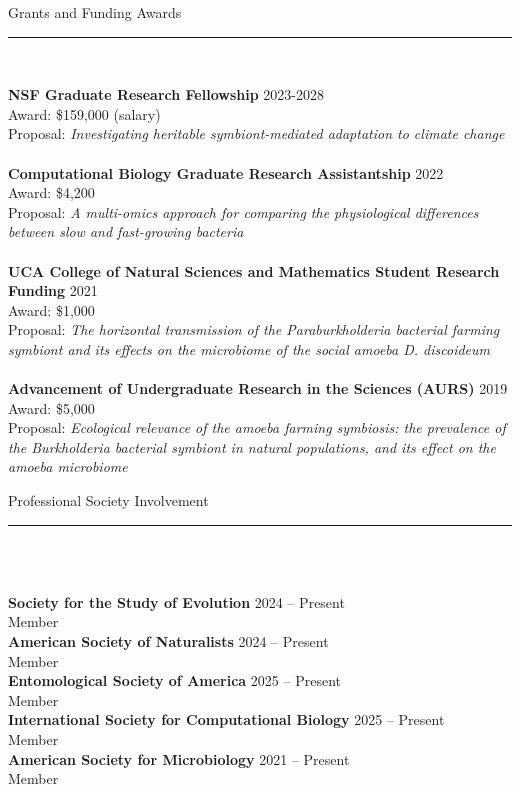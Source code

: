 \documentclass{article}
\begin{document}
\begin{flushleft}
{\Large Grants and Funding Awards} \rule{16.51cm}{0.4pt}\\
\end{flushleft}
\textbf{NSF Graduate Research Fellowship} \hfill 2023-2028\\
Award: \$159,000 (salary)\\
Proposal: \emph{Investigating heritable symbiont-mediated adaptation to climate change}\\
\\
\textbf{Computational Biology Graduate Research Assistantship} \hfill 2022\\
Award: \$4,200\\
Proposal: \emph{A multi-omics approach for comparing the physiological differences between slow and fast-growing bacteria}\\
\\
\textbf{UCA College of Natural Sciences and Mathematics Student Research Funding} \hfill 2021\\
Award: \$1,000\\
Proposal: \emph{The horizontal transmission of the Paraburkholderia bacterial farming symbiont and its effects on the microbiome of the social amoeba D. discoideum}\\
\\
\textbf{Advancement of Undergraduate Research in the Sciences (AURS)} \hfill 2019\\
Award: \$5,000\\
Proposal: \emph{Ecological relevance of the amoeba farming symbiosis: the prevalence of the Burkholderia bacterial symbiont in natural populations, and its effect on the amoeba microbiome}
\\

\begin{flushleft}
    {\Large Professional Society Involvement} \rule{16.51cm}{0.4pt}\\
    \end{flushleft}
    \\


\textbf{Society for the Study of Evolution} \hfill 2024 – Present\\
Member \\
\textbf{American Society of Naturalists} \hfill 2024 – Present\\
Member \\
\textbf{Entomological Society of America} \hfill 2025 – Present\\
Member \\
\textbf{International Society for Computational Biology} \hfill 2025 – Present\\
Member \\
\textbf{American Society for Microbiology} \hfill 2021 – Present\\
Member \\
\end{document}
